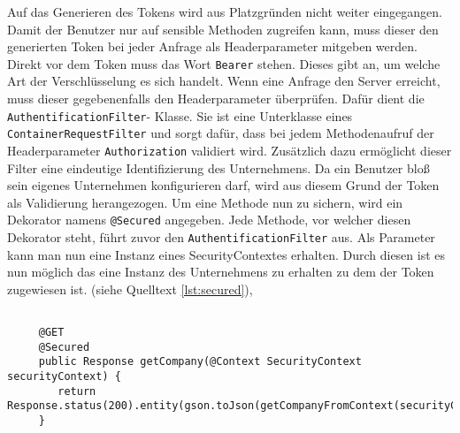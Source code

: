 Auf das Generieren des Tokens wird aus Platzgründen nicht weiter eingegangen. 
Damit der Benutzer nur auf sensible Methoden zugreifen kann, muss dieser den generierten Token bei jeder Anfrage als Headerparameter mitgeben werden. Direkt vor dem Token muss das Wort \texttt{Bearer} stehen. Dieses gibt an, um welche Art der Verschlüsselung es sich handelt.
Wenn eine Anfrage den Server erreicht, muss dieser gegebenenfalls den Headerparameter überprüfen.
Dafür dient die \texttt{AuthentificationFilter}- Klasse. Sie ist eine Unterklasse eines \texttt{ContainerRequestFilter} und sorgt dafür, dass bei jedem Methodenaufruf der Headerparameter \texttt{Authorization} validiert wird. Zusätzlich dazu ermöglicht dieser Filter eine eindeutige Identifizierung des Unternehmens. 
Da ein Benutzer bloß sein eigenes Unternehmen konfigurieren darf, wird aus diesem Grund der Token als Validierung herangezogen.
Um eine Methode nun zu sichern, wird ein Dekorator namens \texttt{@Secured} angegeben. Jede Methode, vor welcher diesen Dekorator steht, führt zuvor den \texttt{AuthentificationFilter} aus.
Als Parameter kann man nun eine Instanz eines SecurityContextes erhalten. Durch diesen ist es nun möglich das eine Instanz des Unternehmens zu erhalten zu dem der Token zugewiesen ist. (siehe Quelltext \ref{lst:secured}),

 \lstset{language=JAVA}
 \begin{lstlisting}[float=htbp, caption={Beispiel des \texttt{@Secured}-Dekorators }, label={lst:secured}]
 
	 @GET
	 @Secured
	 public Response getCompany(@Context SecurityContext securityContext) {
	 	return Response.status(200).entity(gson.toJson(getCompanyFromContext(securityContext))).build();
	 }
 \end{lstlisting}
 

